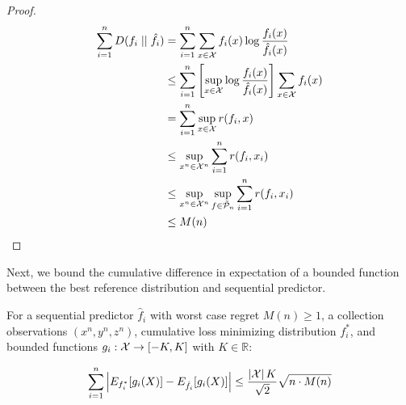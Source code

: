 \begin{proof}
\begin{align}
\sum_{i=1}^n D(f_i \mid \mid \hat{f}_i)
&= \sum_{i=1}^n \sum_{x\in\mathcal{X}} f_i(x)
    \log \frac{f_i(x)}{\hat{f}_i(x)} \\
&\le \sum_{i=1}^n
    \left[ \sup_{x\in\mathcal{X}}
    \log \frac{f_i(x)}{\hat{f}_i(x)} \right]
    \sum_{x\in\mathcal{X}} f_i(x) \\
&= \sum_{i=1}^n \sup_{x\in\mathcal{X}} r(f_i,x) \\
&\le \sup_{x^n\in\mathcal{X}^n} \sum_{i=1}^n r(f_i,x_i)\\
&\le \sup_{x^n\in\mathcal{X}^n} \sup_{f\in\tilde{\mathcal{P}}_n} \sum_{i=1}^n r(f_i,x_i)\\
&\le M(n)
\end{align}
\end{proof}

Next, we bound the cumulative difference in expectation of a bounded function between the best reference distribution and sequential predictor.

\begin{lemma}
For a sequential predictor $\hat{f}_i$ with worst case regret $M(n)\ge 1$, a collection observations $(x^n,y^n,z^n)$, cumulative loss minimizing distribution $f^*_i$, and bounded functions $g_i:\mathcal{X}\rightarrow [-K,K]$ with $K\in\mathbb{R}$:

\begin{equation}
\sum_{i=1}^n \left| E_{f^*_i}[g_i(X)] -
    E_{\hat{f}_i}[g_i(X)] \right| \le
    \frac{\left|\mathcal{X}\right|K}{\sqrt{2}}\sqrt{n \cdot M(n)}
\end{equation}
\end{lemma}


